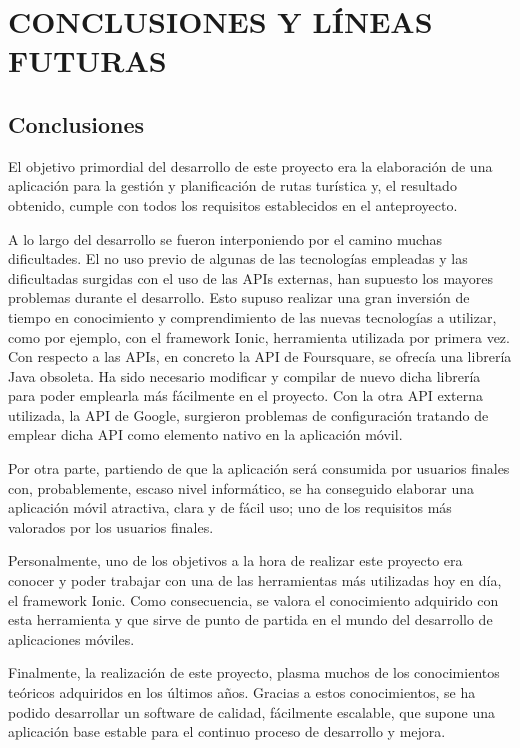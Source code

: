\chapter[Conclusiones y líneas futuras]{
  \label{chp:conclusiones}
  CONCLUSIONES Y LÍNEAS FUTURAS
}
\thispagestyle{numberingStyle}
\pagestyle{numberingStyle}

\section{Conclusiones}

El objetivo primordial del desarrollo de este proyecto era la elaboración de una aplicación para la gestión y planificación de rutas turística y, el resultado obtenido, cumple con todos los requisitos establecidos en el anteproyecto.

A lo largo del desarrollo se fueron interponiendo por el camino muchas dificultades. El no uso previo de algunas de las tecnologías empleadas  y las dificultadas surgidas con el uso de las APIs externas, han supuesto los mayores problemas durante el desarrollo. Esto supuso realizar una gran inversión de tiempo en conocimiento y comprendimiento de las nuevas tecnologías a utilizar, como por ejemplo, con el framework Ionic, herramienta utilizada por primera vez. Con respecto a las APIs, en concreto la API de Foursquare, se ofrecía una librería Java obsoleta. Ha sido necesario modificar y compilar de nuevo dicha librería para poder emplearla más fácilmente en el proyecto. Con la otra API externa utilizada, la API de Google, surgieron problemas de configuración tratando de emplear dicha API como elemento nativo en la aplicación móvil.

Por otra parte, partiendo de que la aplicación será consumida por usuarios finales con, probablemente, escaso nivel informático, se ha conseguido elaborar una aplicación móvil atractiva, clara y de fácil uso; uno de los requisitos más valorados por los usuarios finales.

Personalmente, uno de los objetivos a la hora de realizar este proyecto era conocer y poder trabajar con una de las herramientas más utilizadas hoy en día, el framework Ionic. Como consecuencia, se valora el conocimiento adquirido con esta herramienta y que sirve de punto de partida en el mundo del desarrollo de aplicaciones móviles.

Finalmente, la realización de este proyecto, plasma muchos de los conocimientos teóricos adquiridos en los últimos años. Gracias a estos conocimientos, se ha podido desarrollar un software de calidad, fácilmente escalable, que supone una aplicación base estable para el continuo proceso de desarrollo y mejora.


